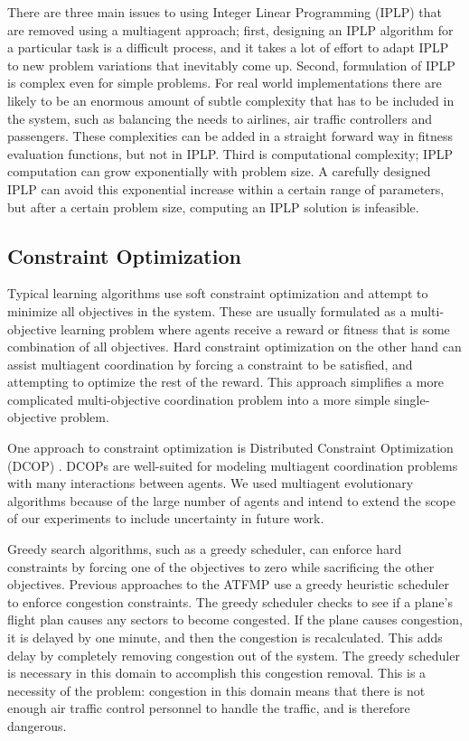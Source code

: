 \documentclass{sig-alternate}
\begin{document}
There are three main issues to using Integer Linear Programming (IPLP) that are removed using a multiagent approach; first, designing an IPLP algorithm for a particular task is a difficult process, and it takes a lot of effort to adapt IPLP to new problem variations that inevitably come up. Second, formulation of IPLP is complex even for simple problems. For real world implementations there are likely to be an enormous amount of subtle complexity that has to be included in the system, such as balancing the needs to airlines, air traffic controllers and passengers. These complexities can be added in a straight forward way in fitness evaluation functions, but not in IPLP. Third is computational complexity; IPLP computation can grow exponentially with problem size. A carefully designed IPLP can avoid this exponential increase within a certain range of parameters, but after a certain problem size, computing an IPLP solution is infeasible.

\subsection{Constraint Optimization}

Typical learning algorithms use soft constraint optimization and attempt to minimize all objectives in the system. These are usually formulated as a multi-objective learning problem where agents receive a reward or fitness that is some combination of all objectives. Hard constraint optimization on the other hand can assist multiagent coordination by forcing a constraint to be satisfied, and attempting to optimize the rest of the reward. This approach simplifies a more complicated multi-objective coordination problem into a more simple single-objective problem.

One approach to constraint optimization is Distributed Constraint Optimization (DCOP) \cite{Junges:2008:EPD:1402298.1402308, Modi:2005:AAD:1120120.1120127}. DCOPs are well-suited for modeling multiagent coordination problems with many interactions between agents. We used multiagent evolutionary algorithms because of the large number of agents and intend to extend the scope of our experiments to include uncertainty in future work.

Greedy search algorithms, such as a greedy scheduler, can enforce hard constraints by forcing one of the objectives to zero while sacrificing the other objectives. Previous approaches to the ATFMP use a greedy heuristic scheduler \cite{Rios} to enforce congestion constraints. The greedy scheduler checks to see if a plane's flight plan causes any sectors to become congested. If the plane causes congestion, it is delayed by one minute, and then the congestion is recalculated. This adds delay by completely removing congestion out of the system. The greedy scheduler is necessary in this domain to accomplish this congestion removal. This is a necessity of the problem: congestion in this domain means that there is not enough air traffic control personnel to handle the traffic, and is therefore dangerous.
\end{document}
